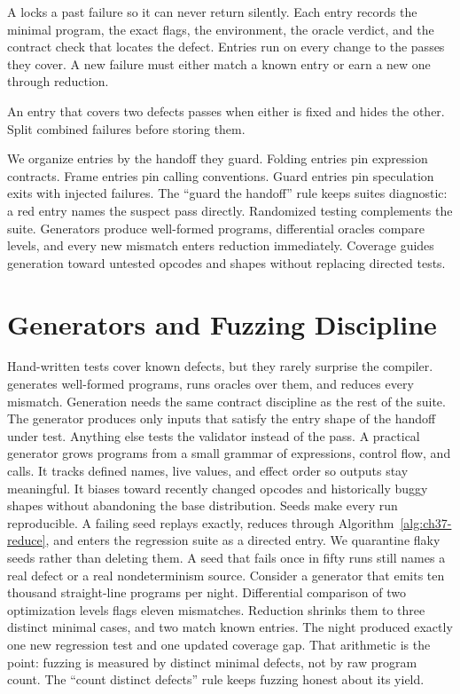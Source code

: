 A  locks a past failure so it can never return silently.
Each entry records the minimal program, the exact flags, the environment, the oracle verdict, and the contract check that locates the defect.
Entries run on every change to the passes they cover.
A new failure must either match a known entry or earn a new one through reduction.
\begin{ccnote}
An entry that covers two defects passes when either is fixed and hides the other.
Split combined failures before storing them.
\end{ccnote}
We organize entries by the handoff they guard.
Folding entries pin expression contracts.
Frame entries pin calling conventions.
Guard entries pin speculation exits with injected failures.
The \enquote{guard the handoff} rule keeps suites diagnostic: a red entry names the suspect pass directly.
Randomized testing complements the suite.
Generators produce well-formed programs, differential oracles compare levels, and every new mismatch enters reduction immediately.
Coverage guides generation toward untested opcodes and shapes without replacing directed tests.

\section{Generators and Fuzzing Discipline}\label{sec:ch37-fuzzing}

Hand-written tests cover known defects, but they rarely surprise the compiler.
 generates well-formed programs, runs oracles over them, and reduces every mismatch.
Generation needs the same contract discipline as the rest of the suite.
The generator produces only inputs that satisfy the entry shape of the handoff under test.
Anything else tests the validator instead of the pass.
A practical generator grows programs from a small grammar of expressions, control flow, and calls.
It tracks defined names, live values, and effect order so outputs stay meaningful.
It biases toward recently changed opcodes and historically buggy shapes without abandoning the base distribution.
Seeds make every run reproducible.
A failing seed replays exactly, reduces through Algorithm~\ref{alg:ch37-reduce}, and enters the regression suite as a directed entry.
We quarantine flaky seeds rather than deleting them.
A seed that fails once in fifty runs still names a real defect or a real nondeterminism source.
Consider a generator that emits ten thousand straight-line programs per night.
Differential comparison of two optimization levels flags eleven mismatches.
Reduction shrinks them to three distinct minimal cases, and two match known entries.
The night produced exactly one new regression test and one updated coverage gap.
That arithmetic is the point: fuzzing is measured by distinct minimal defects, not by raw program count.
The \enquote{count distinct defects} rule keeps fuzzing honest about its yield.

